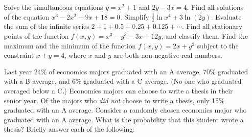 \documentclass[addpoints,12pt]{exam}
\begin{document}
\begin{questions}

\question Solve the simultaneous equations $y = x^2 + 1$ and $2y - 3x = 4$.
\question Find all solutions of the equation $x^3 - 2x^2 - 9x + 18 = 0$.
\question Simplify $\frac{1}{2}\ln x^4 + 3\ln(2y)$.
\question Evaluate the sum of the infinite series $2 + 1 + 0.5 + 0.25 + 0.125 + \cdots$.
\question Find all stationary points of the function $f(x,y) = x^3 - y^3 - 3x + 12y$, and classify them.
\question Find the maximum and the minimum of the function $f(x,y) = 2x + y^2$ subject to the constraint $x + y = 4$, where $x$ and $y$ are both non-negative real numbers.



\question Last year 24\% of economics majors graduated with an A average, 70\% graduated with a B average, and 6\% graduated with a C average. (No one who graduated averaged below a C.) Economics majors can choose to write a thesis in their senior year. Of the majors who \emph{did not} choose to write a thesis, only 15\% graduated with an A average. Consider a randomly chosen economics major who graduated with an A average. What is the probability that this student wrote a thesis? 
\question Briefly answer each of the following:



\end{questions}
\end{document}
